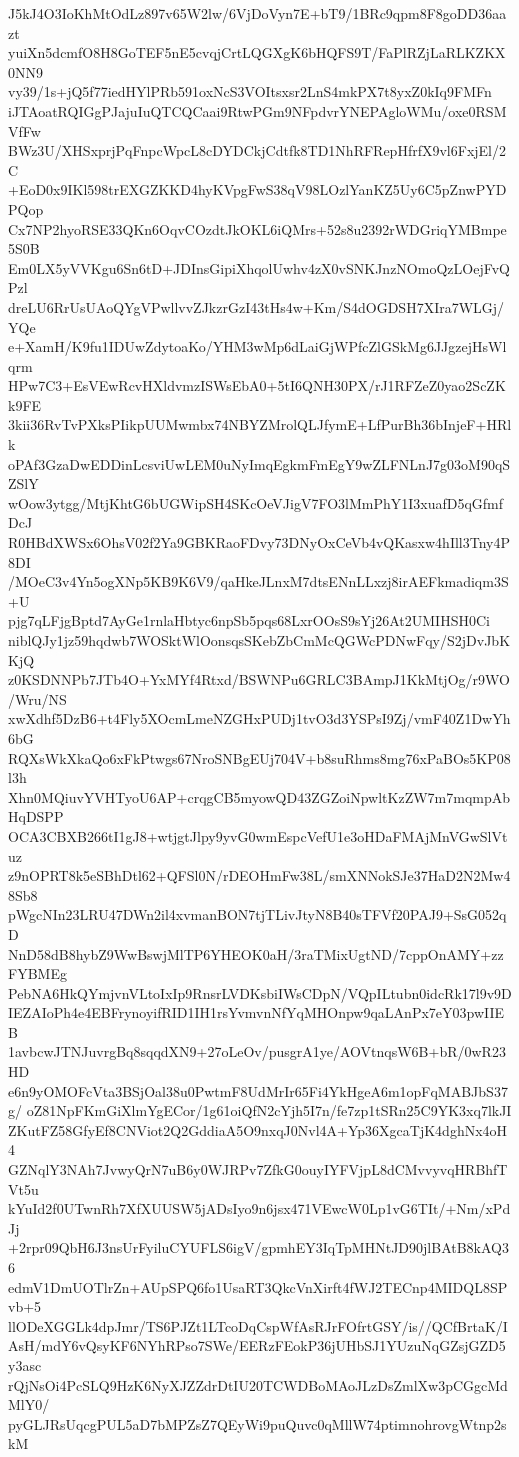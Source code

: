 J5kJ4O3IoKhMtOdLz897v65W2lw/6VjDoVyn7E+bT9/1BRc9qpm8F8goDD36aazt
yuiXn5dcmfO8H8GoTEF5nE5cvqjCrtLQGXgK6bHQFS9T/FaPlRZjLaRLKZKX0NN9
vy39/1s+jQ5f77iedHYlPRb591oxNcS3VOItsxsr2LnS4mkPX7t8yxZ0kIq9FMFn
iJTAoatRQIGgPJajuIuQTCQCaai9RtwPGm9NFpdvrYNEPAgloWMu/oxe0RSMVfFw
BWz3U/XHSxprjPqFnpcWpcL8cDYDCkjCdtfk8TD1NhRFRepHfrfX9vl6FxjEl/2C
+EoD0x9IKl598trEXGZKKD4hyKVpgFwS38qV98LOzlYanKZ5Uy6C5pZnwPYDPQop
Cx7NP2hyoRSE33QKn6OqvCOzdtJkOKL6iQMrs+52s8u2392rWDGriqYMBmpe5S0B
Em0LX5yVVKgu6Sn6tD+JDInsGipiXhqolUwhv4zX0vSNKJnzNOmoQzLOejFvQPzl
dreLU6RrUsUAoQYgVPwllvvZJkzrGzI43tHs4w+Km/S4dOGDSH7XIra7WLGj/YQe
e+XamH/K9fu1IDUwZdytoaKo/YHM3wMp6dLaiGjWPfcZlGSkMg6JJgzejHsWlqrm
HPw7C3+EsVEwRcvHXldvmzISWsEbA0+5tI6QNH30PX/rJ1RFZeZ0yao2ScZKk9FE
3kii36RvTvPXksPIikpUUMwmbx74NBYZMrolQLJfymE+LfPurBh36bInjeF+HRlk
oPAf3GzaDwEDDinLcsviUwLEM0uNyImqEgkmFmEgY9wZLFNLnJ7g03oM90qSZSlY
wOow3ytgg/MtjKhtG6bUGWipSH4SKcOeVJigV7FO3lMmPhY1I3xuafD5qGfmfDcJ
R0HBdXWSx6OhsV02f2Ya9GBKRaoFDvy73DNyOxCeVb4vQKasxw4hIll3Tny4P8DI
/MOeC3v4Yn5ogXNp5KB9K6V9/qaHkeJLnxM7dtsENnLLxzj8irAEFkmadiqm3S+U
pjg7qLFjgBptd7AyGe1rnlaHbtyc6npSb5pqs68LxrOOsS9sYj26At2UMIHSH0Ci
niblQJy1jz59hqdwb7WOSktWlOonsqsSKebZbCmMcQGWcPDNwFqy/S2jDvJbKKjQ
z0KSDNNPb7JTb4O+YxMYf4Rtxd/BSWNPu6GRLC3BAmpJ1KkMtjOg/r9WO/Wru/NS
xwXdhf5DzB6+t4Fly5XOcmLmeNZGHxPUDj1tvO3d3YSPsI9Zj/vmF40Z1DwYh6bG
RQXsWkXkaQo6xFkPtwgs67NroSNBgEUj704V+b8suRhms8mg76xPaBOs5KP08l3h
Xhn0MQiuvYVHTyoU6AP+crqgCB5myowQD43ZGZoiNpwltKzZW7m7mqmpAbHqDSPP
OCA3CBXB266tI1gJ8+wtjgtJlpy9yvG0wmEspcVefU1e3oHDaFMAjMnVGwSlVtuz
z9nOPRT8k5eSBhDtl62+QFSl0N/rDEOHmFw38L/smXNNokSJe37HaD2N2Mw48Sb8
pWgcNIn23LRU47DWn2il4xvmanBON7tjTLivJtyN8B40sTFVf20PAJ9+SsG052qD
NnD58dB8hybZ9WwBswjMlTP6YHEOK0aH/3raTMixUgtND/7cppOnAMY+zzFYBMEg
PebNA6HkQYmjvnVLtoIxIp9RnsrLVDKsbiIWsCDpN/VQpILtubn0idcRk17l9v9D
IEZAIoPh4e4EBFrynoyifRID1IH1rsYvmvnNfYqMHOnpw9qaLAnPx7eY03pwIIEB
1avbcwJTNJuvrgBq8sqqdXN9+27oLeOv/pusgrA1ye/AOVtnqsW6B+bR/0wR23HD
e6n9yOMOFcVta3BSjOal38u0PwtmF8UdMrIr65Fi4YkHgeA6m1opFqMABJbS37g/
oZ81NpFKmGiXlmYgECor/1g61oiQfN2cYjh5I7n/fe7zp1tSRn25C9YK3xq7lkJI
ZKutFZ58GfyEf8CNViot2Q2GddiaA5O9nxqJ0Nvl4A+Yp36XgcaTjK4dghNx4oH4
GZNqlY3NAh7JvwyQrN7uB6y0WJRPv7ZfkG0ouyIYFVjpL8dCMvvyvqHRBhfTVt5u
kYuId2f0UTwnRh7XfXUUSW5jADsIyo9n6jsx471VEwcW0Lp1vG6TIt/+Nm/xPdJj
+2rpr09QbH6J3nsUrFyiluCYUFLS6igV/gpmhEY3IqTpMHNtJD90jlBAtB8kAQ36
edmV1DmUOTlrZn+AUpSPQ6fo1UsaRT3QkcVnXirft4fWJ2TECnp4MIDQL8SPvb+5
llODeXGGLk4dpJmr/TS6PJZt1LTcoDqCspWfAsRJrFOfrtGSY/is//QCfBrtaK/I
AsH/mdY6vQsyKF6NYhRPso7SWe/EERzFEokP36jUHbSJ1YUzuNqGZsjGZD5y3asc
rQjNsOi4PcSLQ9HzK6NyXJZZdrDtIU20TCWDBoMAoJLzDsZmlXw3pCGgcMdMlY0/
pyGLJRsUqcgPUL5aD7bMPZsZ7QEyWi9puQuvc0qMllW74ptimnohrovgWtnp2skM
